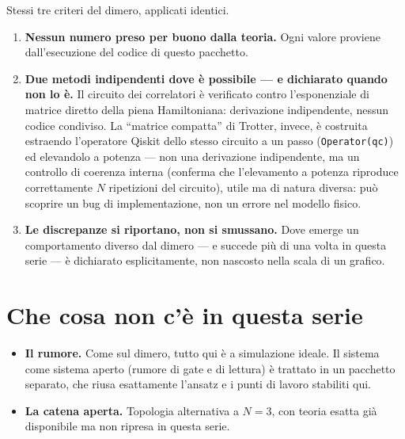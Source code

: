 \documentclass[11pt,a4paper]{article}
\begin{document}
Stessi tre criteri del dimero, applicati identici.

\begin{enumerate}[leftmargin=1.5em,itemsep=3pt]
\item \textbf{Nessun numero preso per buono dalla teoria.} Ogni valore
proviene dall'esecuzione del codice di questo pacchetto.
\item \textbf{Due metodi indipendenti dove è possibile --- e dichiarato
quando non lo è.} Il circuito dei correlatori è verificato contro
l'esponenziale di matrice diretto della piena Hamiltoniana: derivazione
indipendente, nessun codice condiviso. La ``matrice compatta'' di Trotter,
invece, è costruita estraendo l'operatore Qiskit dello stesso circuito a
un passo (\texttt{Operator(qc)}) ed elevandolo a potenza --- non una
derivazione indipendente, ma un controllo di coerenza interna (conferma
che l'elevamento a potenza riproduce correttamente $N$ ripetizioni del
circuito), utile ma di natura diversa: può scoprire un bug di
implementazione, non un errore nel modello fisico.
\item \textbf{Le discrepanze si riportano, non si smussano.} Dove emerge un
comportamento diverso dal dimero --- e succede più di una volta in questa
serie --- è dichiarato esplicitamente, non nascosto nella scala di un
grafico.
\end{enumerate}


\section{Che cosa non c'è in questa serie}

\begin{itemize}[leftmargin=1.5em,itemsep=2pt]
\item \textbf{Il rumore.} Come sul dimero, tutto qui è a simulazione ideale.
Il sistema come sistema aperto (rumore di gate e di lettura) è trattato in un
pacchetto separato, che riusa esattamente l'ansatz e i punti di lavoro
stabiliti qui.
\item \textbf{La catena aperta.} Topologia alternativa a $N=3$, con teoria
esatta già disponibile ma non ripresa in questa serie.
\end{itemize}
\end{document}
